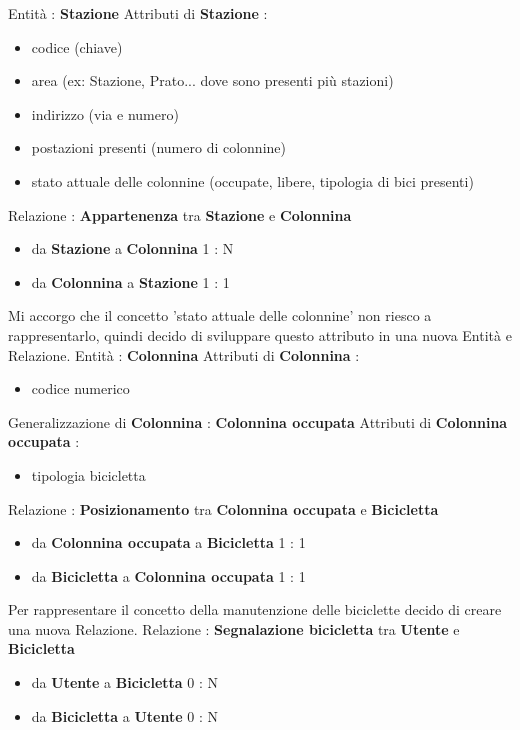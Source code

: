 \documentclass[a4paper,twoside]{article}
\begin{document}
Entità : \textbf{Stazione}\newline
Attributi di \textbf{Stazione} :
\begin{itemize}
 \item codice (chiave)
 \item area (ex: Stazione, Prato... dove sono presenti più stazioni)
 \item indirizzo (via e numero)
 \item postazioni presenti (numero di colonnine)
 \item stato attuale delle colonnine (occupate, libere, tipologia di bici presenti)
 \end{itemize}
Relazione : \textbf{Appartenenza} tra \textbf{Stazione} e \textbf{Colonnina}
\begin{itemize}
 \item da \textbf{Stazione} a \textbf{Colonnina} 1 : N
 \item da \textbf{Colonnina} a \textbf{Stazione} 1 : 1
\end{itemize}
Mi accorgo che il concetto 'stato attuale delle colonnine' non riesco a rappresentarlo, quindi decido di sviluppare questo attributo in una nuova Entità e Relazione.\newline
Entità : \textbf{Colonnina}\newline
Attributi di \textbf{Colonnina} :
\begin{itemize}
 \item codice numerico
\end{itemize}
Generalizzazione di \textbf{Colonnina} : \textbf{Colonnina occupata}\newline
Attributi di \textbf{Colonnina occupata} :
\begin{itemize}
 \item tipologia bicicletta
\end{itemize}
Relazione : \textbf{Posizionamento} tra \textbf{Colonnina occupata} e \textbf{Bicicletta}
\begin{itemize}
 \item da \textbf{Colonnina occupata} a \textbf{Bicicletta} 1 : 1
 \item da \textbf{Bicicletta} a \textbf{Colonnina occupata} 1 : 1
\end{itemize}
Per rappresentare il concetto della manutenzione delle biciclette decido di creare una nuova Relazione.\newline
Relazione : \textbf{Segnalazione bicicletta} tra \textbf{Utente} e \textbf{Bicicletta}
\begin{itemize}
 \item da \textbf{Utente} a \textbf{Bicicletta} 0 : N
 \item da \textbf{Bicicletta} a \textbf{Utente} 0 : N
\end{itemize}
\end{document}
